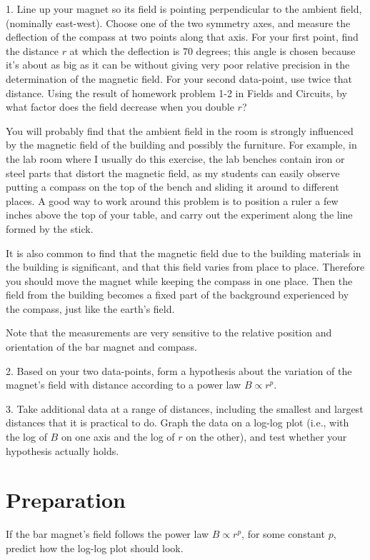1. Line up your magnet so its field is pointing perpendicular to the ambient field,
(nominally east-west). Choose one
of the two symmetry axes, and measure the
deflection of the compass at two points along that axis.
For your first point, find the
distance $r$ at which the deflection is 70 degrees; this angle is chosen because
it's about as big as it can be without giving very poor relative precision 
in the determination of the magnetic field. For your second data-point,
use twice that distance. Using the result of homework problem 
1-2 in Fields and Circuits, by what factor does the field decrease
when you double $r$?

You will probably find that the ambient field in the room is strongly
influenced by the magnetic field of the building and possibly the
furniture.  For example, in the lab room where I usually do this
exercise, the lab benches contain iron or steel parts that distort the
magnetic field, as my students can easily observe putting a compass on
the top of the bench and sliding it around to different places. 
A good way to work around this problem is to position a ruler a few 
inches above the top of your table, and carry out the experiment along the line
formed by the stick.

It is also common to find that the
magnetic field due to the building materials in the building is
significant, and that this field varies from place to place.  Therefore you
should move the magnet while keeping the compass in one place.  Then
the field from the building becomes a fixed part of the background
experienced by the compass, just like the earth's field. 

Note that the measurements are very sensitive to the
relative position and orientation of the bar magnet and
compass. 

2. Based on your two data-points, form a hypothesis about the variation
of the magnet's field with distance according to a power law $B\propto
r^p$. 

3. Take additional data at a range of distances, including the smallest
and largest distances that it is practical to do. Graph the data on a log-log
plot (i.e., with the log of $B$ on one axis and the log of $r$ on the other),
and test whether your hypothesis actually holds.

\section*{Preparation}

If the bar magnet's field follows the power law $B\propto r^p$, for some constant $p$,
predict how the log-log plot should look.


